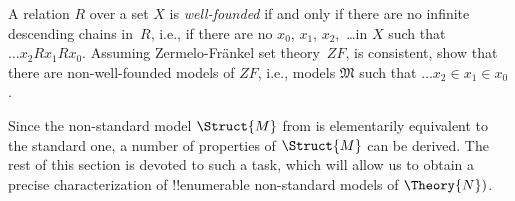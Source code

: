 \documentclass[../../include/open-logic-section]{subfiles}
\begin{document}
\begin{prob}
A relation $R$ over a set $X$ is \emph{well-founded} if and only if
there are no infinite descending chains in~$R$, i.e., if there are no
$x_0$, $x_1$, $x_2$,~\dots in $X$ such that $\dots x_2Rx_1Rx_0$.  Assuming
Zermelo-Fr\"ankel set theory~$ZF$, is consistent, show that there are
non-well-founded models of $ZF$, i.e., models $\mathfrak{M}$ such that
$\dots x_2 \in x_1 \in x_0$.
\end{prob}

Since the non-standard model $\Struct{M}$ from  is
elementarily equivalent to the standard one, a number of properties of
$\Struct{M}$ can be derived. The rest of this section is devoted to
such a task, which will allow us to obtain a precise characterization
of !!{enumerable} non-standard models of $\Theory{N})$.
\end{document}
